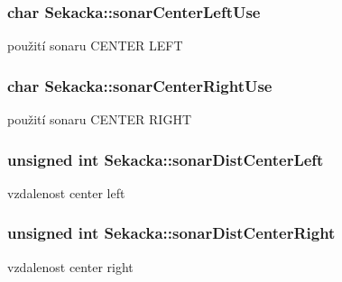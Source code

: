 \subsubsection[{\texorpdfstring{sonar\+Center\+Left\+Use}{sonarCenterLeftUse}}]{\setlength{\rightskip}{0pt plus 5cm}char Sekacka\+::sonar\+Center\+Left\+Use\hspace{0.3cm}{\ttfamily [private]}}\hypertarget{class_sekacka_aa43c6437efd1edbcfdbb22496ed4a226}{}\label{class_sekacka_aa43c6437efd1edbcfdbb22496ed4a226}
použití sonaru C\+E\+N\+T\+ER L\+E\+FT 
\subsubsection[{\texorpdfstring{sonar\+Center\+Right\+Use}{sonarCenterRightUse}}]{\setlength{\rightskip}{0pt plus 5cm}char Sekacka\+::sonar\+Center\+Right\+Use\hspace{0.3cm}{\ttfamily [private]}}\hypertarget{class_sekacka_aa1dda76e93ca7282a9ae50dc4f980301}{}\label{class_sekacka_aa1dda76e93ca7282a9ae50dc4f980301}
použití sonaru C\+E\+N\+T\+ER R\+I\+G\+HT 
\subsubsection[{\texorpdfstring{sonar\+Dist\+Center\+Left}{sonarDistCenterLeft}}]{\setlength{\rightskip}{0pt plus 5cm}unsigned int Sekacka\+::sonar\+Dist\+Center\+Left\hspace{0.3cm}{\ttfamily [private]}}\hypertarget{class_sekacka_ac854e19a9eb8d30384f5ab0cdcdbaebf}{}\label{class_sekacka_ac854e19a9eb8d30384f5ab0cdcdbaebf}
vzdalenost center left 
\subsubsection[{\texorpdfstring{sonar\+Dist\+Center\+Right}{sonarDistCenterRight}}]{\setlength{\rightskip}{0pt plus 5cm}unsigned int Sekacka\+::sonar\+Dist\+Center\+Right\hspace{0.3cm}{\ttfamily [private]}}\hypertarget{class_sekacka_ac9d9f43f254129e928f8855847132de0}{}\label{class_sekacka_ac9d9f43f254129e928f8855847132de0}
vzdalenost center right 
